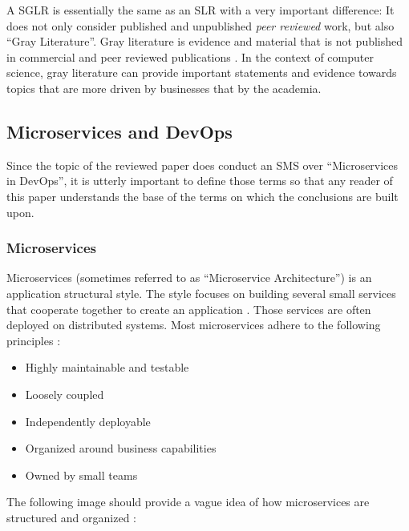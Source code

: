 A SGLR is essentially the same as an SLR with a very important difference:
It does not only consider published and unpublished \textit{peer reviewed} work,
but also ``Gray Literature''. Gray literature is evidence and material that
is not published in commercial and peer reviewed publications \cite{paez:GrayLiterature}.
In the context of computer science, gray literature can provide important statements
and evidence towards topics that are more driven by businesses that by the academia.


\subsection{Microservices and DevOps}

Since the topic of the reviewed paper does conduct an SMS over ``Microservices in DevOps'',
it is utterly important to define those terms so that any reader of this paper
understands the base of the terms on which the conclusions are built upon.

\subsubsection{Microservices}

Microservices (sometimes referred to as ``Microservice Architecture'') is an application
structural style. The style focuses on building several small services that cooperate
together to create an application \cite{richardson:whatIsMSA}. Those services are often deployed on distributed
systems. Most microservices adhere to the following principles \cite{richardson:whatIsMSA}:

\begin{itemize}
    \item Highly maintainable and testable
    \item Loosely coupled
    \item Independently deployable
    \item Organized around business capabilities
    \item Owned by small teams
\end{itemize}

The following image should provide a vague idea of how microservices are structured
and organized \cite{richardson:whatIsMSA}:

